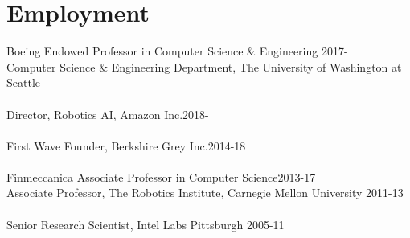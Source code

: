 
\section{Employment}
\noindent
Boeing Endowed Professor in Computer Science \& Engineering \hfill 2017-\\
Computer Science \& Engineering Department, 
The University of Washington at Seattle\\
\\
Director, Robotics AI, Amazon Inc.\hfill 2018-\\
\\
First Wave Founder, Berkshire Grey Inc.\hfill 2014-18\\
\\
Finmeccanica Associate Professor in Computer Science\hfill 2013-17\\
Associate Professor, 
The Robotics Institute,  Carnegie Mellon University
\hfill 2011-13\\
\\
Senior Research Scientist, Intel Labs Pittsburgh \hfill 2005-11

